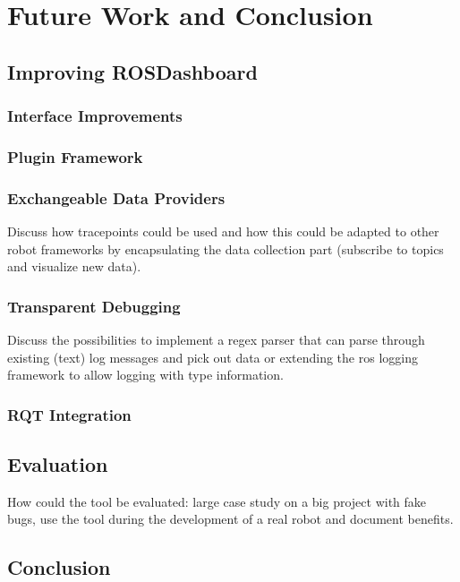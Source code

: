 \chapter{Future Work and Conclusion}
\label{future_work}

\section{Improving ROSDashboard}
\subsection{Interface Improvements}
\subsection{Plugin Framework}
\subsection{Exchangeable Data Providers}
Discuss how tracepoints could be used and how this could be adapted to other robot frameworks by encapsulating the data collection part (subscribe to topics and visualize new data).
\subsection{Transparent Debugging}
Discuss the possibilities to implement a regex parser that can parse through existing (text) log messages and pick out data or extending the ros logging framework to allow logging with type information.
\subsection{RQT Integration}

\section{Evaluation}
How could the tool be evaluated: large case study on a big project with fake bugs, use the tool during the development of a real robot and document benefits.

\section{Conclusion}
